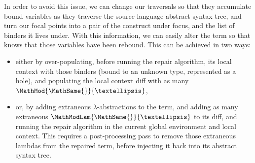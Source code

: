 
In order to avoid this issue, we can change our traversals so that they
accumulate bound variables as they traverse the source language abstract syntax
tree, and turn our focal points into a pair of the construct under focus, and
the list of binders it lives under.  With this information, we can easily alter
the term so that \Chick{} knows that those variables have been rebound.  This
can be achieved in two ways:

\begin{itemize}

  \item either by over-populating, before running the repair algorithm, its
local context with those binders (bound to an unknown type, represented as a
hole), and populating the local context diff with as many
$\MathMod{\MathSame{}}{…}$,

  \item or, by adding extraneous $\lambda$-abstractions to the term, and adding
as many extraneous $\MathModLam{\MathSame{}}{…}$ to its diff, and running the
repair algorithm in the current global environment and local context.  This
requires a post-processing pass to remove those extraneous lambdas from the
repaired term, before injecting it back into its abstract syntax tree.

\end{itemize}
